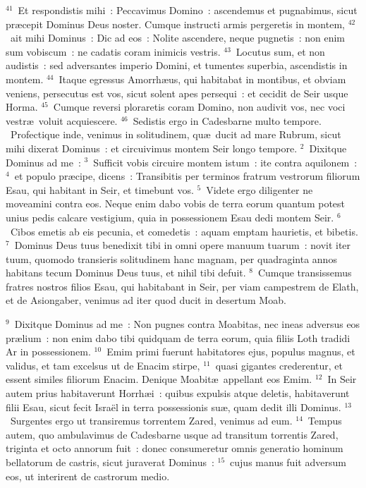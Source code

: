 ${}^{41}$~Et respondistis mihi~: Peccavimus Domino~: ascendemus et pugnabimus, sicut pr\ae cepit Dominus Deus noster. Cumque instructi armis pergeretis in montem,
${}^{42}$~ait mihi Dominus~: Dic ad eos~: Nolite ascendere, neque pugnetis~: non enim sum vobiscum~: ne cadatis coram inimicis vestris.
${}^{43}$~Locutus sum, et non audistis~: sed adversantes imperio Domini, et tumentes superbia, ascendistis in montem.
${}^{44}$~Itaque egressus Amorrh\ae us, qui habitabat in montibus, et obviam veniens, persecutus est vos, sicut solent apes persequi~: et cecidit de Seir usque Horma.
${}^{45}$~Cumque reversi ploraretis coram Domino, non audivit vos, nec voci vestr\ae\ voluit acquiescere.
${}^{46}$~Sedistis ergo in Cadesbarne multo tempore.
~Profectique inde, venimus in solitudinem, qu\ae\ ducit ad mare Rubrum, sicut mihi dixerat Dominus~: et circuivimus montem Seir longo tempore.
${}^{2}$~Dixitque Dominus ad me~:
${}^{3}$~Sufficit vobis circuire montem istum~: ite contra aquilonem~:
${}^{4}$~et populo pr\ae cipe, dicens~: Transibitis per terminos fratrum vestrorum filiorum Esau, qui habitant in Seir, et timebunt vos.
${}^{5}$~Videte ergo diligenter ne moveamini contra eos. Neque enim dabo vobis de terra eorum quantum potest unius pedis calcare vestigium, quia in possessionem Esau dedi montem Seir.
${}^{6}$~Cibos emetis ab eis pecunia, et comedetis~: aquam emptam haurietis, et bibetis.
${}^{7}$~Dominus Deus tuus benedixit tibi in omni opere manuum tuarum~: novit iter tuum, quomodo transieris solitudinem hanc magnam, per quadraginta annos habitans tecum Dominus Deus tuus, et nihil tibi defuit.
${}^{8}$~Cumque transissemus fratres nostros filios Esau, qui habitabant in Seir, per viam campestrem de Elath, et de Asiongaber, venimus ad iter quod ducit in desertum Moab.


${}^{9}$~Dixitque Dominus ad me~: Non pugnes contra Moabitas, nec ineas adversus eos pr\ae lium~: non enim dabo tibi quidquam de terra eorum, quia filiis Loth tradidi Ar in possessionem.
${}^{10}$~Emim primi fuerunt habitatores ejus, populus magnus, et validus, et tam excelsus ut de Enacim stirpe,
${}^{11}$~quasi gigantes crederentur, et essent similes filiorum Enacim. Denique Moabit\ae\ appellant eos Emim.
${}^{12}$~In Seir autem prius habitaverunt Horrh\ae i~: quibus expulsis atque deletis, habitaverunt filii Esau, sicut fecit Isra\"el in terra possessionis su\ae , quam dedit illi Dominus.
${}^{13}$~Surgentes ergo ut transiremus torrentem Zared, venimus ad eum.
${}^{14}$~Tempus autem, quo ambulavimus de Cadesbarne usque ad transitum torrentis Zared, triginta et octo annorum fuit~: donec consumeretur omnis generatio hominum bellatorum de castris, sicut juraverat Dominus~:
${}^{15}$~cujus manus fuit adversum eos, ut interirent de castrorum medio.


